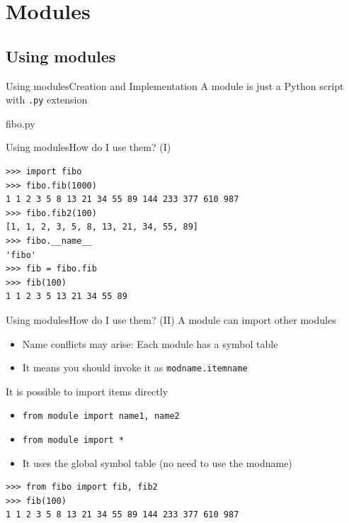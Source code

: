 \documentclass[10pt,compress]{beamer} %
\begin{document}
\section{Modules}

\subsection{Using modules}
\begin{frame}{Using modules}{Creation and Implementation}
	\vspace{-0.2cm}
	A module is just a Python script with \texttt{.py} extension
	\vspace{-0.2cm}
	\begin{exampleblock}{fibo.py}
	\vspace{-0.2cm}
	
	\vspace{-0.2cm}
	\end{exampleblock}
\end{frame}

\begin{frame}[fragile]{Using modules}{How do I use them? (I)}
	\begin{block}{}
	\begin{verbatim}
>>> import fibo
>>> fibo.fib(1000)
1 1 2 3 5 8 13 21 34 55 89 144 233 377 610 987
>>> fibo.fib2(100)
[1, 1, 2, 3, 5, 8, 13, 21, 34, 55, 89]
>>> fibo.__name__
'fibo'
>>> fib = fibo.fib
>>> fib(100)
1 1 2 3 5 13 21 34 55 89
\end{verbatim}
	\vspace{-0.2cm}
	\end{block}
\end{frame}

\begin{frame}[fragile]{Using modules}{How do I use them?  (II)}
	A module can import other modules
		\begin{itemize}
		\item Name conflicts may arise: Each module has a symbol table
		\item It means you should invoke it as \texttt{modname.itemname}
		\end{itemize}
 	It is possible to import items directly
		\begin{itemize}
		\item \texttt{from module import name1, name2}
		\item \texttt{from module import *}
		\item It uses the global symbol table (no need to use the modname)
			\end{itemize}
	
	\begin{exampleblock}{}
	\begin{verbatim}
>>> from fibo import fib, fib2
>>> fib(100)
1 1 2 3 5 8 13 21 34 55 89 144 233 377 610 987
\end{verbatim}
	\end{exampleblock}
\end{frame}
\end{document}
